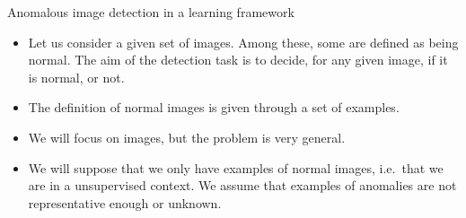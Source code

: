 \documentclass[xcolor=pdftex,dvipsnames,table,mathserif,aspectratio=169]{beamer}
\begin{document}
\begin{frame}{Anomalous image detection in a learning framework}

  \begin{block}{}
    \begin{itemize}
    \item Let us consider a given set of images. Among these, some  are defined as being \alert{normal}. The aim of the detection task is to decide, for any given image, if it is normal, or not.
    \item The definition of normal images is given through a set of examples.
    \end{itemize}
  \end{block}

\pause

  \begin{itemize}
  \item We will focus on images, but the problem is very general.
  \item We will suppose that we only have examples of normal images, i.e.\ that we are in a \alert{unsupervised} context. We assume that examples of anomalies are not representative enough or unknown.
  \end{itemize}


\end{frame}
\end{document}
